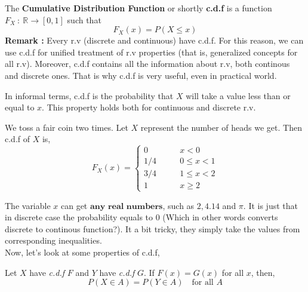 \begin{definition}
    The \textbf{Cumulative Distribution Function} or shortly \textbf{c.d.f} is a function $F_X \ : \ \mathbb{R} \rightarrow [0,1]$ such that
    \[ F_X(x) = P( X \le x) \]
    \textbf{Remark :} Every r.v (discrete and continuous) have c.d.f. For this reason, we can use c.d.f for unified treatment of r.v properties (that is, generalized concepts for all r.v). Moreover, c.d.f contains all the information about r.v, both continous and discrete ones. That is why c.d.f is very useful, even in practical world.
\end{definition}
\par
In informal terms, c.d.f is the probability that $X$ will take a value less than or equal to $x$. This property holds both for continuous and discrete r.v.


\begin{example}
    We toss a fair coin two times. Let $X$ represent the number of heads we get. Then c.d.f of $X$ is,
    \[F_X(x) = 
        \begin{cases} 
          0 \qquad &x < 0\\
          1/4 \qquad &0 \le x <1 \\
          3/4 \qquad &1 \leq x < 2 \\
          1 \qquad &x \ge 2
        \end{cases} 
\]
\end{example}

The variable $x$ can get $\textbf{any real numbers}$, such as $2, 4.14$ and $\pi$. It is just that in discrete case the probability equals to $0$ (Which in other words converts discrete to continous function?). It a bit tricky, they simply take the values from corresponding inequalities.
\\
Now, let's look at some properties of c.d.f,
\begin{theorem}
    Let $X$ have \textit{c.d.f} $F$ and $Y$  have \textit{c.d.f} $G$. If $F(x)=G(x)$ for all $x$, then,
    \[ P(X \in A) = P(Y \in A) \quad \text{for all $A$} \] 
\end{theorem}


